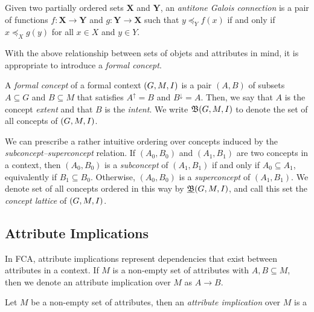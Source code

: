 \begin{definition}
  \label{definition:galois-connection} 
  Given two partially ordered sets $\mathbf{X}$ and $\mathbf{Y}$, an \textit{antitone Galois connection} is a pair of functions $f:\mathbf{X}\!\to\!\mathbf{Y}$ and $g:\mathbf{Y}\!\to\!\mathbf{X}$ such that $y \preceq_Y f(x)$ if and only if $x \preceq_X g(y)$ for all $x\in X$ and $y\in Y$.
\end{definition}

With the above relationship between sets of objets and attributes in mind, it is appropriate to introduce a \textit{formal concept}.

\begin{definition}
  \label{definition:formal-concept} 
  A \textit{formal concept} of a formal context $(G,M,\mathrel{I})$  is a pair $(A,B)$ of subsets $A \subseteq G$ and $B \subseteq M$ that satisfies $A^\uparrow = B$ and $B^\downarrow = A$. Then, we say that $A$ is the concept \textit{extent} and that $B$ is the \textit{intent}. We write ${\mathfrak B} (G,M,\mathrel{I})$ to denote the set of all concepts of $(G,M,\mathrel{I})$.
\end{definition}

We can prescribe a rather intuitive ordering over concepts induced by the \textit{subconcept–superconcept} relation. If $(A_0, B_0)$ and $(A_1, B_1)$ are two concepts in a context, then $(A_0, B_0)$ is a \textit{subconcept} of $(A_1, B_1)$ if and only if $A_0 \subseteq A_1$, equivalently if $B_1 \subseteq B_0$. Otherwise, $(A_0, B_0)$ is a \textit{superconcept} of $(A_1, B_1)$. We denote set of all concepts ordered in this way by $\underline{{\mathfrak B}} (G,M,\mathrel{I})$, and call this set the \textit{concept lattice} of $(G,M,\mathrel{I})$.

\subsection{Attribute Implications}
\label{subsection:attribute-implications}

In FCA, attribute implications represent dependencies that exist between attributes in a context. If $M$ is a non-empty set of attributes with $A, B \subseteq M$, then we denote an attribute implication over $M$ as $A \rightarrow B$.

\begin{definition}
     \label{definition:attribute-implication}
     Let $M$ be a non-empty set of attributes, then an \emph{attribute implication} over $M$ is a
\end{definition}



